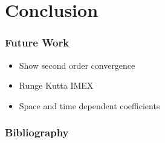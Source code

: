 \documentclass[10pt]{beamer}
\begin{document}
  \section{Conclusion}
    \begin{frame}
      \frametitle{Future Work}
      \begin{itemize}
        \item Show second order convergence
        \item Runge Kutta IMEX
        \item Space and time dependent coefficients
      \end{itemize}
    \end{frame}

    \begin{frame}
      \frametitle{Bibliography}
      \nocite{*}
      \printbibliography{}
    \end{frame}
\end{document}
